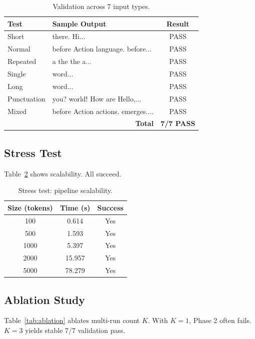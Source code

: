 \documentclass[10pt]{article}
\begin{document}
\begin{table}[t]
\centering
\caption{Validation across 7 input types.}
\label{tab:validation}
\begin{tabular}{llc}
\toprule
\textbf{Test} & \textbf{Sample Output} & \textbf{Result} \\
\midrule
Short & there. Hi... & PASS \\
Normal & before Action language. before... & PASS \\
Repeated & a the the a... & PASS \\
Single & word... & PASS \\
Long & word... & PASS \\
Punctuation & you? world! How are Hello,... & PASS \\
Mixed & before Action actions. emerges.... & PASS \\
\midrule
\multicolumn{2}{r}{\textbf{Total}} & \textbf{7/7 PASS} \\
\bottomrule
\end{tabular}
\end{table}

\subsection{Stress Test}

Table~\ref{tab:stress} shows scalability. All succeed.

\begin{table}[t]
\centering
\caption{Stress test: pipeline scalability.}
\label{tab:stress}
\begin{tabular}{ccc}
\toprule
\textbf{Size (tokens)} & \textbf{Time (s)} & \textbf{Success} \\
\midrule
100 & 0.614 & Yes \\
500 & 1.593 & Yes \\
1000 & 5.397 & Yes \\
2000 & 15.957 & Yes \\
5000 & 78.279 & Yes \\
\bottomrule
\end{tabular}
\end{table}

\subsection{Ablation Study}

Table~\ref{tab:ablation} ablates multi-run count $K$. With $K=1$, Phase 2 often fails. $K=3$ yields stable 7/7 validation pass.
\end{document}
